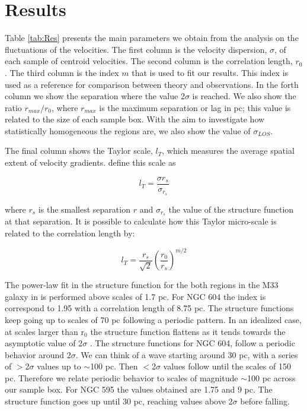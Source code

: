 \documentclass[fleqn,usenatbib, useAMS, a4paper]{mnras}
\newcommand\halpha{H${\alpha}$}
\begin{document}
\section{Results}\label{sec:results}

Table \ref{tab:Res} presents the main parameters we obtain from the analysis on the fluctuations of the velocities.
The first column is the velocity dispersion, \(\sigma\), of each sample of centroid velocities.
The second column is the correlation length, \(r_0\).
The third column is the index \(m\) that is used to fit our results.
This index is used as a reference for comparison between theory and observations.
In the forth column we show the separation where the value 2\(\sigma\) is reached.
We also show the ratio \(r_{max}/r_{0}\), where \(r_{max}\) is the maximum separation or lag in pc; this value is related to the size of each sample box.
With the aim to investigate how statistically homogeneous the regions are, we also show the value of $\sigma_{LOS}$.

The final column shows the Taylor scale, \(l_T\), which measures the average spatial extent of velocity gradients. \citet{1999ApJ...524..895M} define this scale as \citet{1987A&A...176..347H}

\begin{equation}\label{eq:TS}
l_T=\dfrac{\sigma r_s}{\sigma_{r_s}}
\end{equation}

where \(r_s\) is the smallest separation \(r\) and \(\sigma_{r_s}\) the value of the structure function at that separation. It is possible to calculate how this Taylor micro-scale is related to the correlation length by:

\begin{equation}\label{eq:TS1}
l_T=\dfrac{r_s}{\sqrt{2}}(\dfrac{r_0}{r_s})^{m/2}
\end{equation}

The power-law fit in the structure function for the both regions in the M33 galaxy in is performed above scales of 1.7 pc.
For NGC 604 the index is correspond to 1.95 with a correlation length of 8.75 pc.
The structure functions keep going up to scales of 70 pc following a periodic pattern.
In an idealized case, at scales larger than r$_{0}$ the structure function flattens as it tends towards the asymptotic value of 2$\sigma$ \citep{arthur2016turbulence}.
The structure functions for NGC 604, follow a periodic behavior around 2$\sigma$.
We can think of a wave starting around 30 pc, with a series of $ >$2$\sigma$ values up to $\sim$100 pc.
Then $<$2$\sigma$ values follow until the scales of 150 pc.
Therefore we relate periodic behavior to scales of magnitude $\sim$100 pc across our sample box.
For NGC 595 the values obtained are 1.75 and 9 pc.
The structure function goes up until 30 pc, reaching values above 2$\sigma$ before falling.
\end{document}
